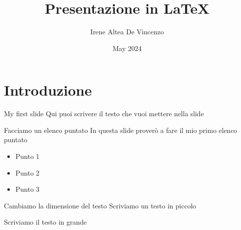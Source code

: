 \documentclass{beamer} %
\title{Presentazione in LaTeX} %
\author{Irene Altea De Vincenzo} %
\date{May 2024} %
\begin{document}

\maketitle %






\section{Introduzione} %

\begin{frame}{My first slide} %
    Qui puoi scrivere il testo che vuoi mettere nella slide
\end{frame} %

\begin{frame}{ Facciamo un elenco puntato}
In questa slide proverò a fare il mio primo elenco puntato
    \begin{itemize} %
        \item Punto 1 %
        \item \pause Punto 2 %
        \item \pause Punto 3
    \end{itemize} %
\end{frame} %

\begin{frame}{Cambiamo la dimensione del testo}
    \scriptsize{Scriviamo un testo in piccolo} %
    
    \huge{Scriviamo il testo in grande} %
\end{frame}
\end{document}
